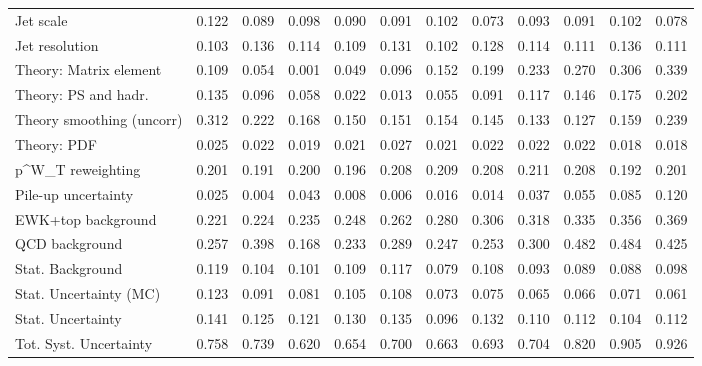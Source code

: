 \begin{tabular}{l|p{0.6cm}p{0.6cm}p{0.6cm}p{0.6cm}p{0.6cm}p{0.6cm}p{0.6cm}p{0.6cm}p{0.6cm}p{0.6cm}p{0.6cm}}
Jet scale                                & 0.122 & 0.089 & 0.098 & 0.090 & 0.091 & 0.102 & 0.073 & 0.093 & 0.091 & 0.102 & 0.078 \\
Jet resolution                           & 0.103 & 0.136 & 0.114 & 0.109 & 0.131 & 0.102 & 0.128 & 0.114 & 0.111 & 0.136 & 0.111 \\
Theory: Matrix element                   & 0.109 & 0.054 & 0.001 & 0.049 & 0.096 & 0.152 & 0.199 & 0.233 & 0.270 & 0.306 & 0.339 \\
Theory: PS and hadr.                     & 0.135 & 0.096 & 0.058 & 0.022 & 0.013 & 0.055 & 0.091 & 0.117 & 0.146 & 0.175 & 0.202 \\
Theory smoothing (uncorr)                & 0.312 & 0.222 & 0.168 & 0.150 & 0.151 & 0.154 & 0.145 & 0.133 & 0.127 & 0.159 & 0.239 \\
Theory: PDF                              & 0.025 & 0.022 & 0.019 & 0.021 & 0.027 & 0.021 & 0.022 & 0.022 & 0.022 & 0.018 & 0.018 \\
p^{W}_{T} reweighting                    & 0.201 & 0.191 & 0.200 & 0.196 & 0.208 & 0.209 & 0.208 & 0.211 & 0.208 & 0.192 & 0.201 \\
Pile-up uncertainty                      & 0.025 & 0.004 & 0.043 & 0.008 & 0.006 & 0.016 & 0.014 & 0.037 & 0.055 & 0.085 & 0.120 \\
EWK+top background                       & 0.221 & 0.224 & 0.235 & 0.248 & 0.262 & 0.280 & 0.306 & 0.318 & 0.335 & 0.356 & 0.369 \\
QCD background                           & 0.257 & 0.398 & 0.168 & 0.233 & 0.289 & 0.247 & 0.253 & 0.300 & 0.482 & 0.484 & 0.425 \\
Stat. Background                         & 0.119 & 0.104 & 0.101 & 0.109 & 0.117 & 0.079 & 0.108 & 0.093 & 0.089 & 0.088 & 0.098 \\
Stat. Uncertainty (MC)                   & 0.123 & 0.091 & 0.081 & 0.105 & 0.108 & 0.073 & 0.075 & 0.065 & 0.066 & 0.071 & 0.061 \\
\hline
Stat. Uncertainty                        & 0.141 & 0.125 & 0.121 & 0.130 & 0.135 & 0.096 & 0.132 & 0.110 & 0.112 & 0.104 & 0.112 \\
\hline
Tot. Syst. Uncertainty                   & 0.758 & 0.739 & 0.620 & 0.654 & 0.700 & 0.663 & 0.693 & 0.704 & 0.820 & 0.905 & 0.926 \\
\hline
\end{tabular}

